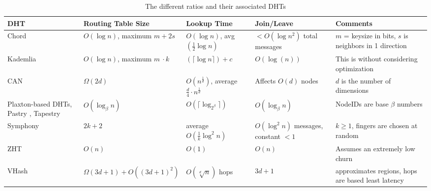 \begin{table}[h]
	\tiny
	\centering
	\begin{tabularx}{\textwidth}{ |X|X|X|X|X| }
		\hline
		DHT & Routing Table Size & Lookup Time & Join/Leave & Comments \\ \hline  
		
		Chord \cite{chord} & $O(\log n)$, maximum $m +2s$ & $O(\log n)$, avg $(\frac{1}{2} \log n)$  &  $<O(\log n^{2})$ total messages& $m$  = keysize in bits, $s$ is neighbors in 1 direction  \\ \hline
		
		Kademlia \cite{kademlia} & $O(\log n)$, maximum $m\ \cdot k$ & $(\lceil \log n\rceil) + c$ & $O(\log(n))$& This is without considering optimization   \\ \hline
		CAN \cite{can} & $\Omega(2d)$ & $O(n^{\frac{1}{d}})$, average $\frac{d}{4}\cdot n^{\frac{1}{d}}$ & Affects $O(d)$ nodes & $d$ is the number of dimensions \\ \hline
		
		Plaxton-based DHTs, Pastry \cite{pastry}, Tapestry \cite{tapestry} & $O(\log_{\beta} n)$ & $ O(\lceil \log_{2^{\beta}} \rceil) $ & $O(\log_{\beta} n)$ &  NodeIDs are base $\beta$ numbers \\ \hline
		
        Symphony \cite{symphony}& $2k + 2$&   average $O(\frac{1}{k} \log^{2} n )$ & $O(\log^{2} n)$ messages,  constant $<1$ &  $k \geq 1$, fingers are chosen at random\\ \hline  
		
        ZHT \cite{li2013zht}&   $O(n)$& $O(1)$ &  $O(n)$ & Assumes an extremely low churn \\ \hline
        
        VHash & $\Omega(3d+1) + O((3d+1)^{2})$ & $O(\sqrt[d]{n})$ hops & $3d + 1$ & approximates regions, hops are based least latency\\ \hline
	\end{tabularx}
	\caption{The different ratios and their associated DHTs}
	\label{tab:tradeoffs}
\end{table}




